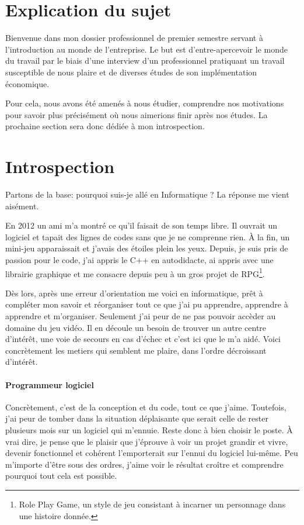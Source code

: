 \documentclass[12pt, a4paper]{report} %
\begin{document}
\section*{Explication du sujet}
Bienvenue dans mon dossier professionnel de premier semestre servant à l'introduction au monde de l'entreprise. Le but est d'entre-apercevoir le monde du travail par le biais d'une interview d'un professionnel pratiquant un travail susceptible de nous plaire et de diverses études de son implémentation économique.

Pour cela, nous avons été amenés à nous étudier, comprendre nos motivations pour savoir plus précisément où nous aimerions finir après nos études. La prochaine section sera donc dédiée à mon introspection.

\section{Introspection}
Partons de la base: pourquoi suis-je allé en Informatique ? La réponse me vient aisément.

En 2012 un ami m'a montré ce qu'il faisait de son temps libre. Il ouvrait un logiciel et tapait des lignes de codes sans que je ne comprenne rien. \`A la fin, un mini-jeu apparaissait et j'avais des étoiles plein les yeux. Depuis, je suis pris de passion pour le code, j'ai appris le C++ en autodidacte, ai appris avec une librairie graphique et me consacre depuis peu à un gros projet de RPG\footnote{Role Play Game, un style de jeu consistant à incarner un personnage dans une histoire donnée.}.

Dès lors, après une erreur d'orientation me voici en informatique, prêt à compléter mon savoir et réorganiser tout ce que j'ai pu apprendre, apprendre à apprendre et m'organiser. Seulement j'ai peur de ne pas pouvoir accèder au domaine du jeu vidéo. Il en découle un besoin de trouver un autre centre d'intérêt, une voie de secours en cas d'échec et c'est ici que le  m'a aidé. Voici concrètement les metiers qui semblent me plaire, dans l'ordre décroissant d'intérêt.

\paragraph{Programmeur logiciel}
Concrètement, c'est de la conception et du code, tout ce que j'aime. Toutefois, j'ai peur de tomber dans la situation déplaisante que serait celle de rester plusieurs mois sur un logiciel qui m'ennuie. Reste donc à bien choisir le poste. \`A vrai dire, je pense que le plaisir que j'éprouve à voir un projet grandir et vivre, devenir fonctionnel et cohérent l'emporterait sur l'ennui du logiciel lui-même. Peu m'importe d'être sous des ordres, j'aime voir le résultat croître et comprendre pourquoi tout cela est possible. 
\end{document}
